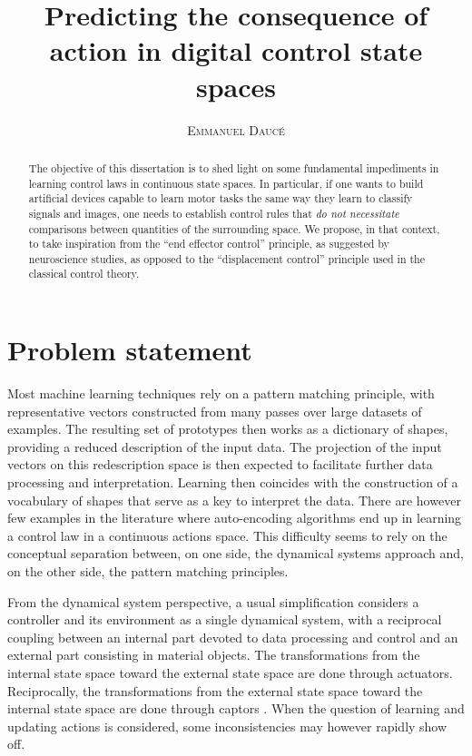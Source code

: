 \documentclass[11pt]{article}
\title{\Huge \textbf{Predicting the consequence of action in digital control state spaces} }
\author{\textsc{Emmanuel Daucé}}%
\begin{document}
\maketitle
\begin{abstract}




The objective  of this dissertation is to shed light on some fundamental impediments 
in learning control laws in continuous state spaces. 
In particular, if one wants to build artificial devices capable to learn motor tasks
the same way they learn to classify signals and images, 
one needs to establish control rules that \textit{do not necessitate} comparisons between quantities
of the surrounding space.
We propose, in that context, to
take inspiration from the ``end effector control'' principle, as suggested by neuroscience studies,  
as opposed to the ``displacement control'' principle used in the classical control theory. 

\end{abstract}

\section{Problem statement}


Most machine learning techniques rely on a pattern matching principle, with representative vectors constructed from many passes over large datasets of examples.
The resulting set of prototypes then works as a dictionary of shapes, providing a reduced description of the input data. The projection of the input vectors on this redescription space is then expected to facilitate further data processing and interpretation.
Learning then coincides with the construction of a vocabulary of shapes that serve as a key to interpret the data. 
There are however few examples in the literature where auto-encoding algorithms end up in learning a control law in a continuous actions space.  
This difficulty seems to rely on the conceptual separation between, on one side, the dynamical systems approach and, on the other side, the pattern matching principles.

From the dynamical system perspective, a usual simplification considers a controller and its environment as a single dynamical system, with a reciprocal coupling between an internal part devoted to data processing and control and an external part consisting in material objects. The transformations from the internal state space toward the external state space are done through actuators. Reciprocally, the transformations from the external state space toward the internal state space are done through captors . 
When  the question of learning and updating actions is considered, some inconsistencies may however rapidly show off. 
\end{document}
